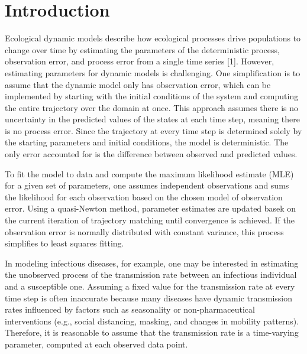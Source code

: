 \documentclass[
11pt, %
oneside, %
english, %
singlespacing, %
]{macthesis} %
\begin{document}
\label{lastoffront}
\clearpage


\mainmatter %
\pagestyle{thesis}
\chapter{Introduction}\label{introduction}

Ecological dynamic models describe how ecological processes drive populations to change over time by estimating the parameters of the deterministic process, observation error, and process error from a single time series {[}1{]}. However, estimating parameters for dynamic models is challenging. One simplification is to assume that the dynamic model only has observation error, which can be implemented by starting with the initial conditions of the system and computing the entire trajectory over the domain at once. This approach assumes there is no uncertainty in the predicted values of the states at each time step, meaning there is no process error. Since the trajectory at every time step is determined solely by the starting parameters and initial conditions, the model is deterministic. The only error accounted for is the difference between observed and predicted values.

To fit the model to data and compute the maximum likelihood estimate (MLE) for a given set of parameters, one assumes independent observations and sums the likelihood for each observation based on the chosen model of observation error. Using a quasi-Newton method, parameter estimates are updated basek on the current iteration of trajectory matching until convergence is achieved. If the observation error is normally distributed with constant variance, this process simplifies to least squares fitting.

In modeling infectious diseases, for example, one may be interested in estimating the unobserved process of the transmission rate between an infectious individual and a susceptible one. Assuming a fixed value for the transmission rate at every time step is often inaccurate because many diseases have dynamic transmission rates influenced by factors such as seasonality or non-pharmaceutical interventions (e.g., social distancing, masking, and changes in mobility patterns). Therefore, it is reasonable to assume that the transmission rate is a time-varying parameter, computed at each observed data point.
\end{document}
